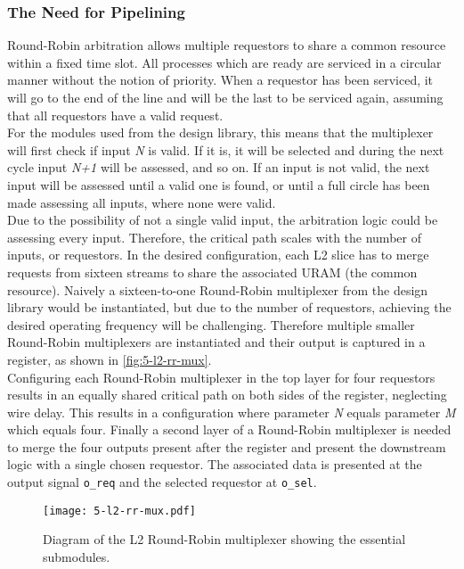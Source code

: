 \subsubsection{The Need for Pipelining}
Round-Robin arbitration allows multiple requestors to share a common resource within a fixed time slot. All processes which are ready are serviced in a circular manner without the notion of priority. When a requestor has been serviced, it will go to the end of the line and will be the last to be serviced again, assuming that all requestors have a valid request.\\
For the modules used from the design library, this means that the multiplexer will first check if input \textit{N} is valid. If it is, it will be selected and during the next cycle input \textit{N+1} will be assessed, and so on. If an input is not valid, the next input will be assessed until a valid one is found, or until a full circle has been made assessing all inputs, where none were valid.\\
Due to the possibility of not a single valid input, the arbitration logic could be assessing every input. Therefore, the critical path scales with the number of inputs, or requestors. In the desired configuration, each L2 slice has to merge requests from sixteen streams to share the associated URAM (the common resource). Naively a sixteen-to-one Round-Robin multiplexer from the design library would be instantiated, but due to the number of requestors, achieving the desired operating frequency will be challenging. Therefore multiple smaller Round-Robin multiplexers are instantiated and their output is captured in a register, as shown in \autoref{fig:5-l2-rr-mux}.\\
Configuring each Round-Robin multiplexer in the top layer for four requestors results in an equally shared critical path on both sides of the register, neglecting wire delay. This results in a configuration where parameter \textit{N} equals parameter \textit{M} which equals four. Finally a second layer of a Round-Robin multiplexer is needed to merge the four outputs present after the register and present the downstream logic with a single chosen requestor. The associated data is presented at the output signal \texttt{o\_req} and the selected requestor at \texttt{o\_sel}.

\begin{figure}[H]
  \centering
  \texttt{[image: 5-l2-rr-mux.pdf]}
  \caption{Diagram of the L2 Round-Robin multiplexer showing the essential submodules.}
  \label{fig:5-l2-rr-mux}
\end{figure}

